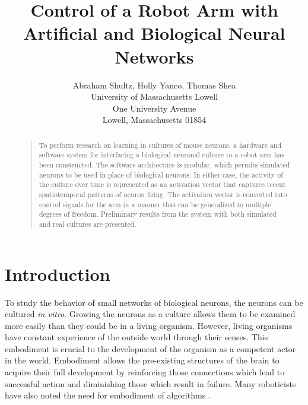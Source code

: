 \documentclass[letterpaper]{article}
\begin{document}
%
\title{Control of a Robot Arm with Artificial and Biological Neural Networks}
\author{Abraham Shultz, Holly Yanco, Thomas Shea\\
University of Massachusetts Lowell\\
One University Avenue\\
Lowell, Massachusetts 01854\\
}
\maketitle
\begin{abstract}
\begin{quote}
To perform research on learning in cultures of mouse neurons, a hardware and software system for interfacing a biological neuronal culture to a robot arm has been constructed. 
The software architecture is modular, which permits simulated neurons to be used in place of biological neurons. 
In either case, the activity of the culture over time is represented as an activation vector that captures recent spatiotemporal patterns of neuron firing. 
The activation vector is converted into control signals for the arm in a manner that can be generalized to multiple degrees of freedom. 
Preliminary results from the system with both simulated and real cultures are presented. 
\end{quote}
\end{abstract}

\section{Introduction}

To study the behavior of small networks of biological neurons, the neurons can be cultured \textit{in vitro}. 
Growing the neurons as a culture allows them to be examined more easily than they could be in a living organism. 
However, living organisms have constant experience of the outside world through their senses. 
This embodiment is crucial to the development of the organism as a competent actor in the world.
Embodiment allows the pre-existing structures of the brain to acquire their full development by reinforcing those connections which lead to successful action and diminishing those which result in failure. 
Many roboticists have also noted the need for embodiment of algorithms \cite{brooks1991intelligence,anderson2003embodied,chiel1997brain}. 
\end{document}
